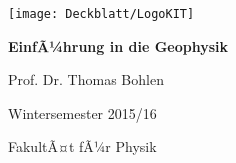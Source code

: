 \begin{titlepage}
	\centering
	\texttt{[image: Deckblatt/LogoKIT]}
 	\vspace{1.5cm} \par
	{\huge\bfseries EinfÃ¼hrung in die Geophysik  \par}
	\vspace{2cm}
	{\Large Prof. Dr. Thomas Bohlen\par}
	\vspace{1cm}
	
	{\large Wintersemester 2015/16}
	\vfill
	\par

	\vfill

	{\large FakultÃ¤t fÃ¼r Physik \par}
\end{titlepage}


